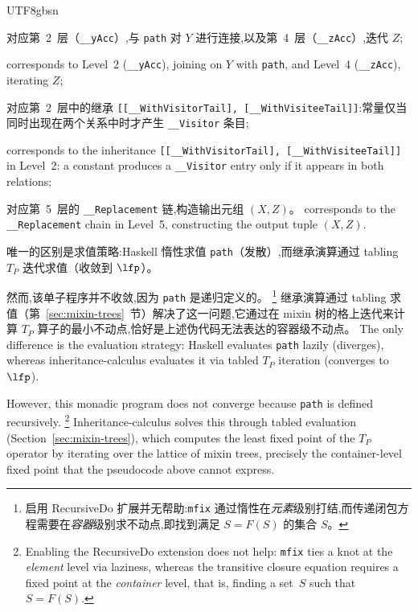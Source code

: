 \begin{CJK*}{UTF8}{gbsn}
\begin{description}
    \ifPaperChinese
    \begin{sloppypar}
    对应第~2~层（\texttt{__yAcc}）,与 \texttt{path} 对 $Y$ 进行连接,以及第~4~层（\texttt{__zAcc}）,迭代 $Z$;
    \end{sloppypar}
    \else
    corresponds to Level~2 (\texttt{__yAcc}), joining on $Y$
    with \texttt{path}, and Level~4 (\texttt{__zAcc}),
    iterating $Z$;
    \fi
  \item[\texttt{guard (y0 == y1)}]
    \ifPaperChinese
    \begin{sloppypar}
    对应第~2~层中的继承 \texttt{[[__WithVisitorTail], [__WithVisiteeTail]]}:常量仅当同时出现在两个关系中时才产生 \texttt{__Visitor} 条目;
    \end{sloppypar}
    \else
    \begin{sloppypar}
    corresponds to the inheritance
    \texttt{[[__WithVisitorTail], [__WithVisiteeTail]]} in
    Level~2: a constant produces a \texttt{__Visitor} entry
    only if it appears in both relations;
    \end{sloppypar}
    \fi
  \item[\texttt{return (x, z)}]
    \ifPaperChinese
    对应第~5~层的 \texttt{__Replacement} 链,构造输出元组 $(X, Z)$。
    \else
    corresponds to the \texttt{__Replacement} chain in
    Level~5, constructing the output tuple $(X, Z)$.
    \fi
\end{description}
\ifPaperChinese
唯一的区别是求值策略:Haskell 惰性求值 \texttt{path}（发散）,而继承演算通过 tabling $T_P$ 迭代求值（收敛到 $\lfp$）。

然而,该单子程序并不收敛,因为 \texttt{path} 是递归定义的。%
\footnote{
  启用 RecursiveDo 扩展并无帮助:\texttt{mfix} 通过惰性在\emph{元素}级别打结,而传递闭包方程需要在\emph{容器}级别求不动点,即找到满足 $S = F(S)$ 的集合 $S$。
}
继承演算通过 tabling 求值（第~\ref{sec:mixin-trees}~节）解决了这一问题,它通过在 mixin 树的格上迭代来计算 $T_P$ 算子的最小不动点,恰好是上述伪代码无法表达的容器级不动点。
\else
The only difference is the evaluation strategy:
Haskell evaluates \texttt{path} lazily (diverges),
whereas inheritance-calculus evaluates it via tabled
$T_P$ iteration (converges to $\lfp$).

\begin{sloppypar}
However, this monadic program does not converge because
\texttt{path} is defined recursively.%
\footnote{
  Enabling the RecursiveDo extension does not help:
  \texttt{mfix} ties a knot at the \emph{element} level via laziness,
  whereas the transitive closure equation requires a
  fixed point at the \emph{container} level, that is, finding a
  set~$S$ such that $S = F(S)$.
}
Inheritance-calculus solves this through tabled evaluation
(Section~\ref{sec:mixin-trees}), which computes the
least fixed point of the $T_P$ operator by iterating
over the lattice of mixin trees, precisely the
container-level fixed point that the pseudocode above cannot express.
\end{sloppypar}
\fi


\end{CJK*}
